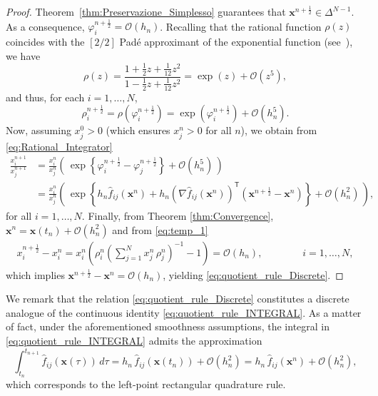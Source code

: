 \documentclass[11pt,letterpaper]{article}
\theoremstyle{remark}
\begin{document}
\begin{proof}
   Theorem~\ref{thm:Preservazione_Simplesso} guarantees that $\bm{x}^{n+\frac{1}{2}} \in \Delta^{N-1}$. As a consequence,  $\varphi_i^{n+\frac{1}{2}} = \mathcal{O}(h_n)$. Recalling that the rational function $\rho(z)$ coincides with the $[2/2]$ Padé approximant of the exponential function (see~\cite[Sections~1.2 and~1.4]{Pade_Book}), we have
    \begin{equation*}
        \rho(z) = \frac{1 + \frac{1}{2} z + \frac{1}{12} z^2}{1 - \frac{1}{2} z + \frac{1}{12} z^2} = \exp(z) + \mathcal{O}(z^5),
    \end{equation*}
    and thus, for each $i = 1,\dots,N$,
    \begin{equation*}
        \rho_i^{n+\frac{1}{2}} = \rho\left( \varphi_i^{n+\frac{1}{2}} \right) = \exp\left( \varphi_i^{n+\frac{1}{2}} \right) + \mathcal{O}(h_n^5).
    \end{equation*}
    Now, assuming $x_j^0 > 0$ (which ensures $x_j^n > 0$ for all $n$), we obtain from \eqref{eq:Rational_Integrator}
    \begin{equation*}
        \begin{split}
            \frac{x_i^{n+1}}{x_j^{n+1}} &= \frac{x_i^n}{x_j^n} \left( \, \exp\left\{ \varphi_i^{n+\frac{1}{2}}-\varphi_j^{n+\frac{1}{2}} \right\} + \mathcal{O}(h_n^5) \, \right) \\
            &= \frac{x_i^n}{x_j^n} \left( \, \exp\left\{ h_n \hat{f}_{ij}(\bm{x}^n) + h_n (\nabla \hat{f}_{ij}(\bm{x}^n) )^\mathsf{T}(\bm{x}^{n+\frac{1}{2}}-\bm{x}^n)\right\} + \mathcal{O}(h_n^2) \, \right),
        \end{split}
    \end{equation*}
    for all $i=1,\dots,N.$ Finally, from Theorem \ref{thm:Convergence}, $\bm{x}^n=\bm{x}(t_n)+\mathcal{O}(h_n^2)$ and from \eqref{eq:temp_1} 
    \begin{equation*}
        \begin{split}
            x_i^{n+\frac{1}{2}}-x_i^n=x_i^n \left( \rho_i^n\left(\displaystyle\sum_{j=1}^N x_j^n \, \rho_j^n\right)^{-1}-1\right)=\mathcal{O}(h_n), \qquad \qquad i=1,\dots, N,
        \end{split}
    \end{equation*}
    which implies $\bm{x}^{n+\frac{1}{2}} - \bm{x}^n = \mathcal{O}(h_n)$, yielding \eqref{eq:quotient_rule_Discrete}.
\end{proof}
We remark that the relation \eqref{eq:quotient_rule_Discrete} constitutes a discrete analogue of the continuous identity \eqref{eq:quotient_rule_INTEGRAL}. As a matter of fact, under the aforementioned smoothness assumptions, the integral in \eqref{eq:quotient_rule_INTEGRAL} admits the approximation
\begin{equation*}
    \int_{t_n}^{t_{n+1}} \hat{f}_{ij}(\bm{x}(\tau)) \, d\tau = h_n \, \hat{f}_{ij}(\bm{x}(t_n)) + \mathcal{O}(h_n^2)= h_n \, \hat{f}_{ij}(\bm{x}^n) + \mathcal{O}(h_n^2),
\end{equation*}
which corresponds to the left-point rectangular quadrature rule.
\end{document}
